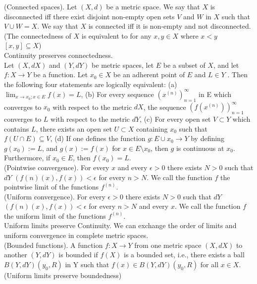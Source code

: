 \documentclass[10pt]{article}
\begin{document}
\begin{small}
(Connected spaces). 
Let $(X, d)$ be a metric space. 
We say that $X$ is disconnected iff there exist disjoint non-empty open sets $V$ and $W$ in $X$ such that $V \cup W = X$. 
We say that $X$ is connected iff it is non-empty and not disconnected. (The connectedness of $X$ is equivalent to for any $x,y\in X$ where $x<y$ $[x,y]\subseteq X$)\\
Continuity preserves connectedness.\\

Let $(X, dX )$ and $(Y, dY )$ be metric spaces, let $E$ be a subset of $X$, and let $f:X\rightarrow Y$ be a function. Let $x_0 \in X$ be an adherent point of $E$ and $L \in Y$ . Then the following four statements are logically equivalent:
(a) $\lim_{x\rightarrow x_0;x\in E}f(x)=L$, 
(b) For every sequence $(x^{(n)})^\infty_{n=1}$ in E which converges to $x_0$ with respect to the metric $dX$, the sequence $(f(x^{(n)}))^\infty_{n=1}$ converges to $L$ with respect to the metric $dY$,
(c) For every open set $V \subset Y$ which contains $L$, there exists an open set $U\subset X$ containing $x_0$ such that $f(U\cap E)\subseteq V$, 
(d) If one defines the function $g : E\cup{x_0} \rightarrow Y$ by defining $g(x_0) := L$, and $g(x) := f(x)$ for $x \in E\setminus{x_0}$, then $g$ is continuous at $x_0$. Furthermore, if $x_0 \in E$, then $f(x_0) = L$.\\

(Pointwise convergence). For every $x$ and every $\epsilon > 0$ there exists $N > 0$ such that $dY$ $(f(n)(x),f(x)) < \epsilon$ for every $n > N$. We call the function $f$ the pointwise limit of the functions $f^{(n)}$.\\

(Uniform convergence). For every $\epsilon > 0$ there exists $N > 0$ such that $dY$ $(f(n)(x),f(x)) < \epsilon$ for every $n > N$ and every $x$. We call the function $f$ the uniform limit of the functions $f^{(n)}$.\\

Uniform limits preserve Continuity. We can exchange the order of limits and uniform convergence in complete metric spaces.\\

(Bounded functions). A function $f : X \rightarrow Y$ from one metric space $(X,dX)$ to another $(Y,dY)$ is bounded if $f(X)$ is a bounded set, i.e., there exists a ball $B(Y,dY )(y_0,R)$ in Y such that $f(x) \in B(Y,dY )(y_0, R)$ for all $x \in X$. (Uniform limits preserve boundedness)\\


\end{small}
\end{document}
